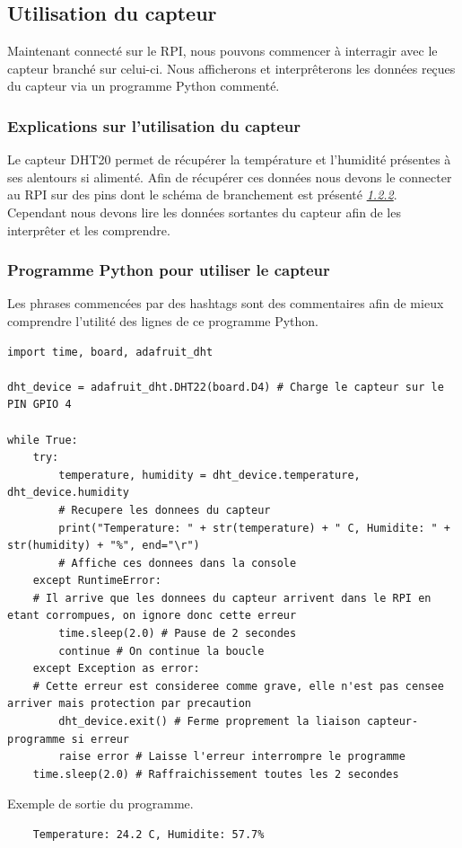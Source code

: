\documentclass[a4paper]{article}
\begin{document}
\subsection{Utilisation du capteur}
Maintenant connecté sur le RPI, nous pouvons commencer à interragir avec le capteur branché sur celui-ci. Nous afficherons et interprêterons les données reçues du capteur via un programme Python commenté.  
\subsubsection{Explications sur l'utilisation du capteur}
Le capteur DHT20 permet de récupérer la température et l'humidité présentes à ses alentours si alimenté. Afin de récupérer ces données nous devons le connecter au RPI sur des pins dont le schéma de branchement est présenté \hyperref[sec:branchementcapteur]{\textit{1.2.2}}. Cependant nous devons lire les données sortantes du capteur afin de les interprêter et les comprendre.
\subsubsection{Programme Python pour utiliser le capteur}
Les phrases commencées par des hashtags sont des commentaires afin de mieux comprendre l'utilité des lignes de ce programme Python.
\begin{lstlisting}[language=iPython]
import time, board, adafruit_dht

dht_device = adafruit_dht.DHT22(board.D4) # Charge le capteur sur le PIN GPIO 4

while True:
    try:
        temperature, humidity = dht_device.temperature, dht_device.humidity 
        # Recupere les donnees du capteur
        print("Temperature: " + str(temperature) + " C, Humidite: " + str(humidity) + "%", end="\r") 
        # Affiche ces donnees dans la console
    except RuntimeError: 
    # Il arrive que les donnees du capteur arrivent dans le RPI en etant corrompues, on ignore donc cette erreur
        time.sleep(2.0) # Pause de 2 secondes
        continue # On continue la boucle
    except Exception as error: 
    # Cette erreur est consideree comme grave, elle n'est pas censee arriver mais protection par precaution
        dht_device.exit() # Ferme proprement la liaison capteur-programme si erreur
        raise error # Laisse l'erreur interrompre le programme
    time.sleep(2.0) # Raffraichissement toutes les 2 secondes 
\end{lstlisting}
Exemple de sortie du programme.
\begin{lstlisting}
    Temperature: 24.2 C, Humidite: 57.7%
\end{lstlisting}
\end{document}
